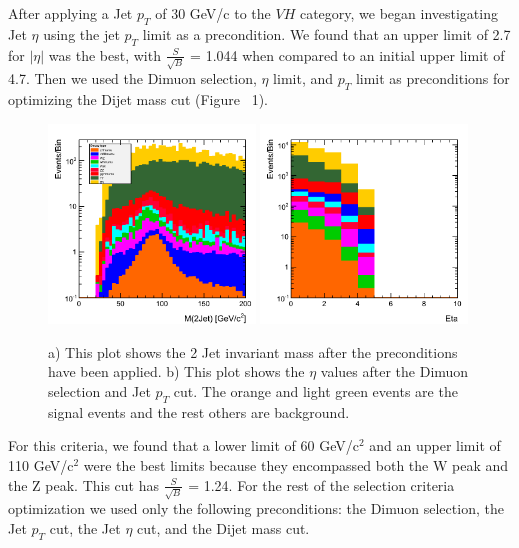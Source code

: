 \documentclass[12pt]{article}
\begin{document}
After applying a Jet $p_{T}$ of 30 GeV/c to the $VH$ category, we began investigating Jet $\eta$ using the jet $p_{T}$ limit as a precondition.  
We found that an upper limit of 2.7 for $|\eta|$ was the best, with $\frac{S}{\sqrt{B}}$ = 1.044 when compared to an initial upper limit of 4.7. 
Then we used the Dimuon selection, $\eta$ limit, and $p_{T}$ limit as preconditions for optimizing the Dijet mass cut (Figure ~1).
\begin{figure}[!hbtp]
\begin{center}
    \includegraphics[width=0.49\textwidth]{images/Hist_jetMass.png}
    \includegraphics[width=0.49\textwidth]{images/Hist_jetEta.png}
    \caption{ \label{fig:myfigurelabel}
         a) This plot shows the 2 Jet invariant mass after the preconditions have been applied. b) This plot shows the $\eta$
	 values after the Dimuon selection and Jet $p_{T}$ cut. The orange and light green events are the signal events and the rest others
	 are background.
      }
\end{center}
\end{figure}
For this criteria, we found that a lower limit of 60 GeV/c$^{2}$ and an upper limit of 110 GeV/c$^{2}$ were the best limits 
because they encompassed both the W peak and the Z peak. 
This cut has $\frac{S}{\sqrt{B}}$ = 1.24. For the rest of the selection criteria optimization we used only the following preconditions: 
the Dimuon selection, the Jet $p_{T}$ cut, the Jet $\eta$ cut, and the Dijet mass cut.
\end{document}
